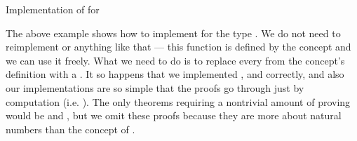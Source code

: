 \begin{example}{Implementation of  for }



\end{example}

The above example shows how to implement  for the type . We do not need to reimplement  or anything like that --- this function is defined by the concept and we can use it freely. What we need to do is to replace every  from the concept's definition with a . It so happens that we implemented ,  and  correctly, and also our implementations are so simple that the proofs go through just by computation (i.e. ). The only theorems requiring a nontrivial amount of proving would be  and , but we omit these proofs because they are more about natural numbers than the concept of .
